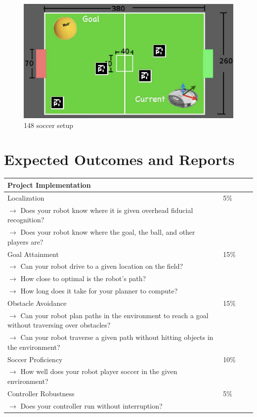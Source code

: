 \begin{figure}[!h]
\centering
\includegraphics[width=0.6\columnwidth]{figures/7_setup.jpg}
\caption{148 soccer setup}
\end{figure}


\section{Expected Outcomes and Reports}

\vspace{1cm}
\begin{tabular}{|l|l||l|l|}
\hline
{\large \bf Project Implementation} & \\
\hline
\hline
Localization & 5\% \\
$\rightarrow$ Does your robot know where it is given overhead fiducial recognition? & \\
$\rightarrow$ Does your robot know where the goal, the ball, and other players are? & \\
\hline
Goal Attainment  & 15\% \\
$\rightarrow$ Can your robot drive to a given location on the field? & \\
$\rightarrow$ How close to optimal is the robot's path? & \\
$\rightarrow$ How long does it take for your planner to compute? & \\
\hline
Obstacle Avoidance & 15\% \\
$\rightarrow$ Can your robot plan paths in the environment to reach a goal without traversing over obstacles? & \\
$\rightarrow$ Can your robot traverse a given path without hitting objects in the environment? & \\
\hline
Soccer Proficiency & 10\% \\
$\rightarrow$ How well does your robot player soccer in the given environment? & \\
\hline
Controller Robustness & 5\% \\
$\rightarrow$ Does your controller run without interruption? & \\
\hline
\end{tabular}

\newpage
